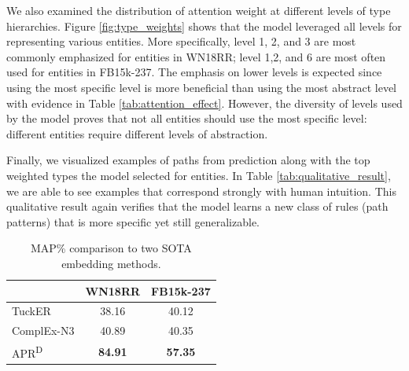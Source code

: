 \documentclass[letterpaper]{article} %
\begin{document}
We also examined the distribution of attention weight at different levels of type hierarchies. Figure \ref{fig:type_weights} shows that the model leveraged all levels for representing various entities. More specifically, level 1, 2, and 3 are most commonly emphasized for entities in WN18RR; level 1,2, and 6 are most often used for entities in FB15k-237. The emphasis on lower levels is expected since using the most specific level is more beneficial than using the most abstract level with evidence in Table \ref{tab:attention_effect}. However, the diversity of levels used by the model proves that not all entities should use the most specific level: different entities require different levels of abstraction.

Finally, we visualized examples of paths from prediction along with the top weighted types the model selected for entities. In Table \ref{tab:qualitative_result}, we are able to see examples that correspond strongly with human intuition. This qualitative result again verifies that the model learns a new class of rules (path patterns) that is more specific yet still generalizable.

\begin{table}[t]
\centering
\begin{tabular}{lcc}
\toprule
& WN18RR & FB15k-237 \\
\midrule
TuckER   & 38.16 &  40.12  \\
ComplEx-N3     & 40.89  &  40.35 \\
APR\textsuperscript{D}      & \textbf{84.91} & \textbf{57.35} \\
\bottomrule
\end{tabular}
\caption{MAP\% comparison to two SOTA embedding methods.}
\label{tab:comparison_with_embedding_methods}
\end{table}
\end{document}
